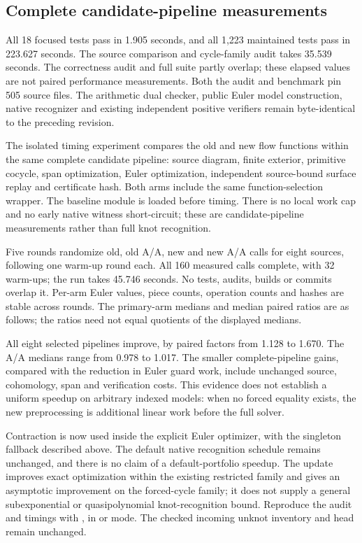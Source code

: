 \subsection{Complete candidate-pipeline measurements}

All 18 focused tests pass in 1.905 seconds, and all 1,223 maintained tests
pass in 223.627 seconds. The source comparison and cycle-family audit takes
35.539 seconds. The correctness audit and full suite partly overlap; these
elapsed values are not paired performance measurements. Both the audit and
benchmark pin 505 source files. The arithmetic dual checker, public Euler
model construction, native recognizer and existing independent positive
verifiers remain byte-identical to the preceding revision.

The isolated timing experiment compares the old and new flow functions
within the same complete candidate pipeline: source diagram, finite exterior,
primitive cocycle, span optimization, Euler optimization, independent
source-bound surface replay and certificate hash. Both arms include the same
function-selection wrapper. The baseline module is loaded before timing.
There is no local work cap and no early native witness short-circuit; these
are candidate-pipeline measurements rather than full knot recognition.

Five rounds randomize old, old A/A, new and new A/A calls for eight sources,
following one warm-up round each. All 160 measured calls complete, with 32
warm-ups; the run takes 45.746 seconds. No tests, audits, builds or commits
overlap it. Per-arm Euler values, piece counts, operation counts and hashes
are stable across rounds. The primary-arm medians and median paired ratios
are as follows; the ratios need not equal quotients of the displayed medians.
\begin{center}
\small

\end{center}
All eight selected pipelines improve, by paired factors from 1.128 to 1.670.
The A/A medians range from 0.978 to 1.017. The smaller complete-pipeline gains,
compared with the reduction in Euler guard work, include unchanged source,
cohomology, span and verification costs. This evidence does not establish a
uniform speedup on arbitrary indexed models: when no forced equality exists,
the new preprocessing is additional linear work before the full solver.

Contraction is now used inside the explicit Euler optimizer, with the
singleton fallback described above. The default native recognition schedule
remains unchanged, and there is no claim of a default-portfolio speedup.
The update improves exact optimization within the existing restricted family
and gives an asymptotic improvement on the forced-cycle family; it does not
supply a general subexponential or quasipolynomial knot-recognition bound.
Reproduce the audit and timings with ,
in  or  mode. The checked incoming
unknot inventory and  head  remain unchanged.
